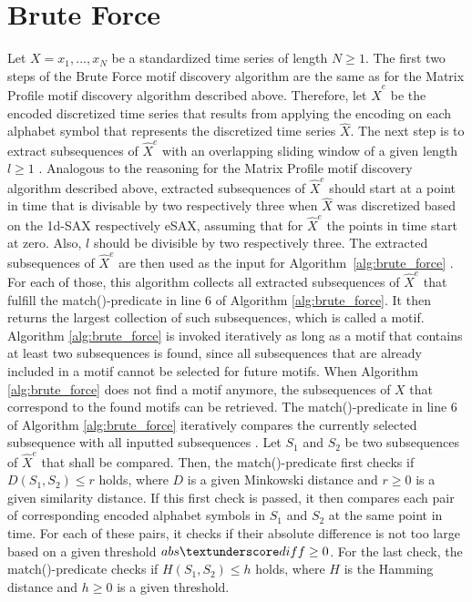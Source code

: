 \section{Brute Force} \label{description_brute_force}
Let $X = x_1, ..., x_N$ be a standardized time series of length $N \geq 1$. The first two steps of the Brute Force motif discovery algorithm are the same as for the Matrix Profile motif discovery algorithm described above. Therefore, let $\hat{X}^e$ be the encoded discretized time series that results from applying the encoding on each alphabet symbol that represents the discretized time series $\hat{X}$. \newline
The next step is to extract subsequences of $\hat{X}^e$ with an overlapping sliding window of a given length $l \geq 1$ \cite{Motif_Definitions}. Analogous to the reasoning for the Matrix Profile motif discovery algorithm described above, extracted subsequences of $\hat{X}^e$ should start at a point in time that is divisable by two respectively three when $\hat{X}$ was discretized based on the \ac{1d-SAX} respectively \ac{eSAX}, assuming that for $\hat{X}^e$ the points in time start at zero. Also, $l$ should be divisible by two respectively three. \newline
The extracted subsequences of $\hat{X}^e$ are then used as the input for \mbox{Algorithm \ref{alg:brute_force}} \cite{Motif_Definitions}. For each of those, this algorithm collects all extracted subsequences of $\hat{X}^e$ that fulfill the match()-predicate in line 6 of Algorithm \ref{alg:brute_force}. It then returns the largest collection of such subsequences, which is called a motif. Algorithm \ref{alg:brute_force} is invoked iteratively as long as a motif that contains at least two subsequences is found, since all subsequences that are already included in a motif cannot be selected for future motifs. When Algorithm \ref{alg:brute_force} does not find a motif anymore, the subsequences of $X$ that correspond to the found motifs can be retrieved. \newline
The match()-predicate in line 6 of Algorithm \ref{alg:brute_force} iteratively compares the currently selected subsequence with all inputted subsequences \cite{Motif_Definitions}. Let $S_1$ and $S_2$ be two subsequences of $\hat{X}^e$ that shall be compared. Then, the match()-predicate first checks if $D(S_1,S_2) \leq r$ holds, where $D$ is a given Minkowski distance and $r \geq 0$ is a given similarity distance. If this first check is passed, it then compares each pair of corresponding encoded alphabet symbols in $S_1$ and $S_2$ at the same point in time. For each of these pairs, it checks if their absolute difference is not too large based on a given threshold $abs \textunderscore diff \geq 0$. For the last check, the match()-predicate checks if $H(S_1,S_2) \leq h$ holds, where $H$ is the Hamming distance and $h \geq 0$ is a given threshold. \newline
